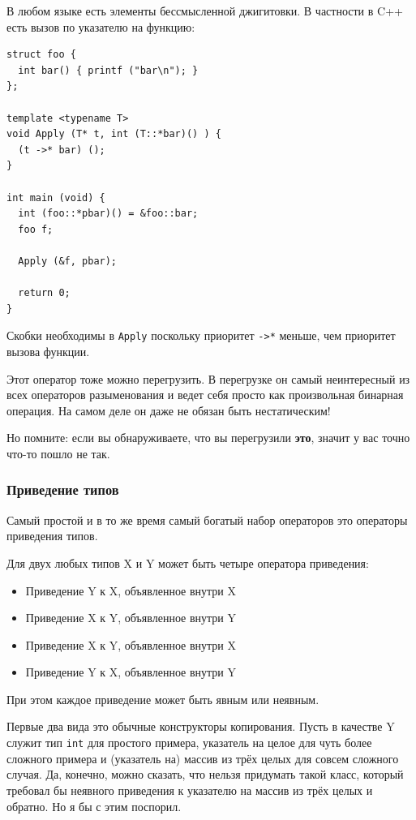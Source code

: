 \documentclass[a4paper,12pt,oneside]{article}
\begin{document}
В любом языке есть элементы бессмысленной джигитовки. В частности в C++ есть вызов по указателю на функцию:

\begin{lstlisting}
struct foo {
  int bar() { printf ("bar\n"); }
};

template <typename T>
void Apply (T* t, int (T::*bar)() ) {
  (t ->* bar) ();
}

int main (void) {
  int (foo::*pbar)() = &foo::bar;
  foo f;

  Apply (&f, pbar);

  return 0;
}
\end{lstlisting}

Скобки необходимы в \lstinline!Apply! поскольку приоритет \lstinline!->*! меньше, чем приоритет вызова функции.

Этот оператор тоже можно перегрузить. В перегрузке он самый неинтересный из всех операторов разыменования и ведет себя просто как произвольная бинарная операция. На самом деле он даже не обязан быть нестатическим!

Но помните: если вы обнаруживаете, что вы перегрузили \textbf{это}, значит у вас точно что-то пошло не так.

\subsubsection{Приведение типов}\label{CastOverloading}

Самый простой и в то же время самый богатый набор операторов это операторы приведения типов.

Для двух любых типов X и Y может быть четыре оператора приведения:

\begin{itemize}
\item Приведение Y к X, объявленное внутри X
\item Приведение X к Y, объявленное внутри Y
\item Приведение X к Y, объявленное внутри X
\item Приведение Y к X, объявленное внутри Y
\end{itemize}

При этом каждое приведение может быть явным или неявным.

Первые два вида это обычные конструкторы копирования. Пусть в качестве Y служит тип \lstinline!int! для простого примера, указатель на целое для чуть более сложного примера и (указатель на) массив из трёх целых для совсем сложного случая. Да, конечно, можно сказать, что нельзя придумать такой класс, который требовал бы неявного приведения к указателю на массив из трёх целых и обратно. Но я бы с этим поспорил.
\end{document}
